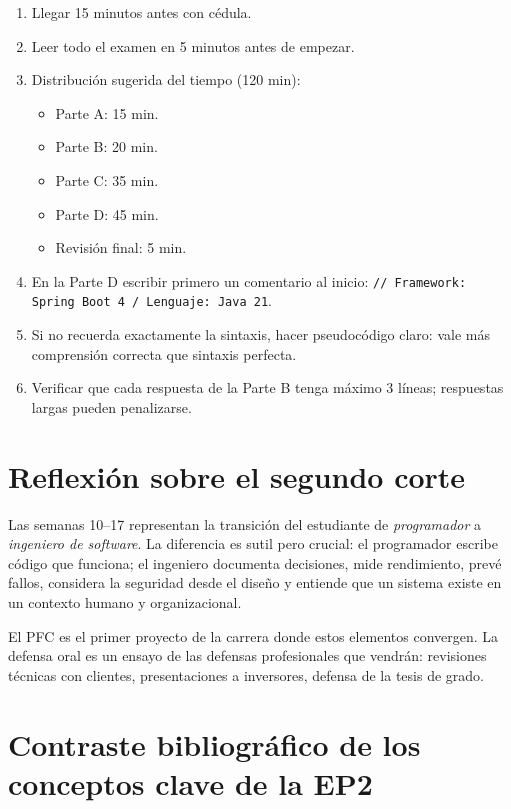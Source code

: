 \begin{enumerate}
\item Llegar 15 minutos antes con cédula.
\item Leer todo el examen en 5 minutos antes de empezar.
\item Distribución sugerida del tiempo (120 min):
\begin{itemize}
\item Parte A: 15 min.
\item Parte B: 20 min.
\item Parte C: 35 min.
\item Parte D: 45 min.
\item Revisión final: 5 min.
\end{itemize}
\item En la Parte D escribir primero un comentario al inicio:
\texttt{// Framework: Spring Boot 4 / Lenguaje: Java 21}.
\item Si no recuerda exactamente la sintaxis, hacer pseudocódigo
claro: vale más comprensión correcta que sintaxis perfecta.
\item Verificar que cada respuesta de la Parte B tenga máximo 3
líneas; respuestas largas pueden penalizarse.
\end{enumerate}

\section{Reflexión sobre el segundo corte}

Las semanas 10--17 representan la transición del estudiante de
\emph{programador} a \emph{ingeniero de software}. La diferencia es
sutil pero crucial: el programador escribe código que funciona; el
ingeniero documenta decisiones, mide rendimiento, prevé fallos,
considera la seguridad desde el diseño y entiende que un sistema
existe en un contexto humano y organizacional.

El PFC es el primer proyecto de la carrera donde estos elementos
convergen. La defensa oral es un ensayo de las defensas profesionales
que vendrán: revisiones técnicas con clientes, presentaciones a
inversores, defensa de la tesis de grado.

\section{Contraste bibliográfico de los conceptos clave de la EP2}

